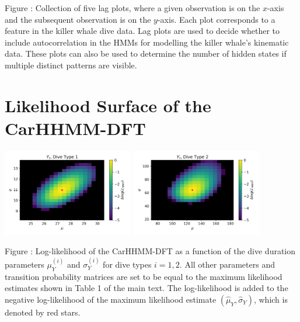 \documentclass{article}
\begin{document}
        \noindent Figure : Collection of five lag plots, where a given observation is on the $x$-axis and the subsequent observation is on the $y$-axis. Each plot corresponds to a feature in the killer whale dive data. Lag plots are used to decide whether to include autocorrelation in the HMMs for modelling the killer whale's kinematic data. These plots can also be used to determine the number of hidden states if multiple distinct patterns are visible. 
        \addtocounter{fignum}{1}
        
        \newpage
        
    \section{Likelihood Surface of the CarHHMM-DFT}
    
        \begin{center}
        \includegraphics[width=2.25in]{../Plots/2019/20190902-182840-CATs_OB_1_0_267_CarHHMM2_coarse-theta-likelihood-dive_duration-1.png}
        \includegraphics[width=2.25in]{../Plots/2019/20190902-182840-CATs_OB_1_0_267_CarHHMM2_coarse-theta-likelihood-dive_duration-2.png}
        \end{center}
        
        \noindent Figure : Log-likelihood of the CarHHMM-DFT as a function of the dive duration parameters $\mu_Y^{(i)}$ and $\sigma_Y^{(i)}$ for dive types $i = 1,2$. All other parameters and transition probability matrices are set to be equal to the maximum likelihood estimates shown in Table 1 of the main text. The log-likelihood is added to the negative log-likelihood of the maximum likelihood estimate $(\hat \mu_Y,\hat \sigma_Y)$, which is denoted by red stars.
        \addtocounter{fignum}{1}
        
\end{document}
